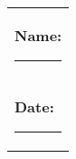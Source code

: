 \documentclass[12pt]{article}
\begin{document}
\pagestyle{fancy}
\fancyhf{}
\setlength{\headheight}{15pt}





\vspace*{0.1cm}

\begin{flushright}
\begin{tabular}{p{14cm}}
\textbf{\large{Name:}} \hrule \\[1.5cm]
\textbf{\large{Date:}} \hrule \\[0.5cm]
\end{tabular}
\end{flushright}
% 


\begin{enumerate}
\end{enumerate}

\newpage

\renewenvironment{question}{\comment}{\endcomment}
\renewenvironment{solution}{\item}{\vfill}



\begin{enumerate}
\end{enumerate}
\end{document}
